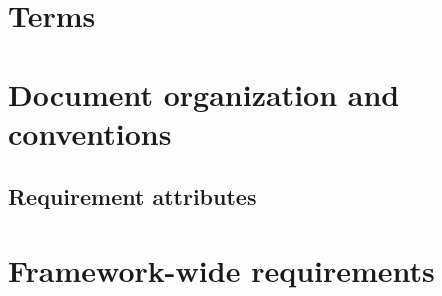 \documentclass[english]{article}
\newcommand{\shortname}{GR}
\begin{document}
\newpage








\section{Terms}


\section{Document organization and conventions}


\subsection{Requirement attributes}


\newpage

\begin{htmlonly}
\end{htmlonly}
\section{Framework-wide requirements}

\setcounter{section}{0}
\renewcommand{\thesection}{\shortname\arabic{section}}
\renewcommand{\thesubsection}{\shortname\arabic{section}.\arabic{subsection}}
\renewcommand{\thesubsubsection}{\shortname\arabic{section}.\arabic{subsection}.\arabic{subsubsection}}


\end{document}
